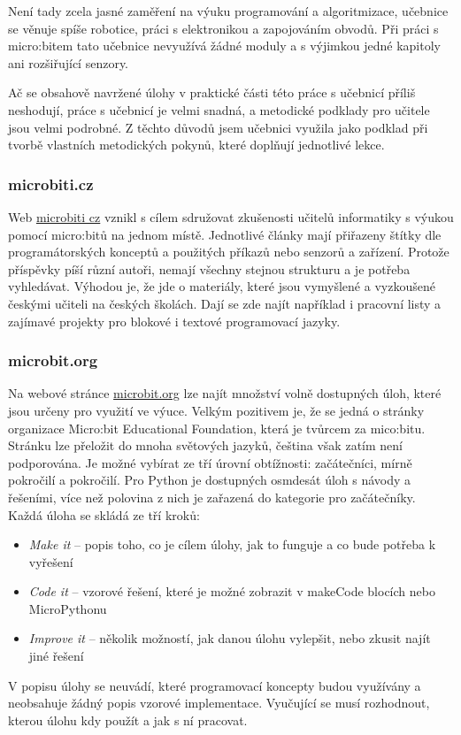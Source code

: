 \documentclass[
  digital,     %
  oneside,     %
  nosansbold,  %
  colorbold, %
  lof,         %
  nolot,         %
]{fithesis4}
\begin{document}
Není tady zcela jasné zaměření na výuku programování a algoritmizace, učebnice se věnuje spíše robotice, práci s elektronikou a zapojováním obvodů. Při práci s micro:bitem tato učebnice nevyužívá žádné moduly a s výjimkou jedné kapitoly ani rozšiřující senzory. 

Ač se obsahově navržené úlohy v praktické části této práce s učebnicí příliš neshodují, práce s učebnicí je velmi snadná, a metodické podklady pro učitele jsou velmi podrobné. Z těchto důvodů jsem učebnici využila jako podklad při tvorbě vlastních metodických pokynů, které doplňují jednotlivé lekce.

\subsubsection{microbiti.cz}
Web \href{microbiti.cz}{microbiti cz} vznikl s cílem sdružovat zkušenosti učitelů informatiky s výukou pomocí micro:bitů na jednom místě. Jednotlivé články mají přiřazeny štítky dle programátorských konceptů a použitých příkazů nebo senzorů a zařízení. Protože příspěvky píší různí autoři, nemají všechny stejnou strukturu a je potřeba vyhledávat. Výhodou je, že jde o materiály, které jsou vymyšlené a vyzkoušené českými učiteli na českých školách. Dají se zde najít například i pracovní listy a zajímavé projekty pro blokové i textové programovací jazyky.

\subsubsection{microbit.org}
Na webové stránce \href{https://microbit.org/teach/classroom-resources/}{microbit.org} lze najít množství volně dostupných úloh, které jsou určeny pro využití ve výuce. Velkým pozitivem je, že se jedná o stránky organizace Micro:bit Educational Foundation, která je tvůrcem za mico:bitu. Stránku lze přeložit do mnoha světových jazyků, čeština však zatím není podporována. Je možné vybírat ze tří úrovní obtížnosti: začátečníci, mírně pokročilí a pokročilí. Pro Python je dostupných osmdesát úloh s návody a řešeními, více než polovina z nich je zařazená do kategorie pro začátečníky. Každá úloha se skládá ze tří kroků:
\begin{itemize}
    \item \textit{Make it} -- popis toho, co je cílem úlohy, jak to funguje a co bude potřeba k vyřešení
    \item \textit{Code it} -- vzorové řešení, které je možné zobrazit v makeCode blocích nebo MicroPythonu
    \item \textit{Improve it} -- několik možností, jak danou úlohu vylepšit, nebo zkusit najít jiné řešení
\end{itemize}
V popisu úlohy se neuvádí, které programovací koncepty budou využívány a neobsahuje žádný popis vzorové implementace. Vyučující se musí rozhodnout, kterou úlohu kdy použít a jak s ní pracovat.
\end{document}
